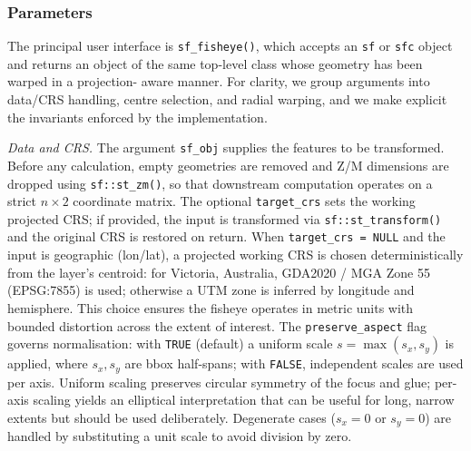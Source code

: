 \subsubsection{Parameters}\label{parameters}

The principal user interface is \texttt{sf\_fisheye()}, which accepts an \texttt{sf} or \texttt{sfc} object
and returns an object of the same top-level class whose geometry has been warped in a projection-
aware manner. For clarity, we group arguments into data/CRS handling, centre selection, and radial
warping, and we make explicit the invariants enforced by the implementation.

\emph{Data and CRS.} The argument \texttt{sf\_obj} supplies the features to be transformed. Before any
calculation, empty geometries are removed and Z/M dimensions are dropped using \texttt{sf::st\_zm()}, so
that downstream computation operates on a strict \(n\times 2\) coordinate matrix. The optional
\texttt{target\_crs} sets the working projected CRS; if provided, the input is transformed via
\texttt{sf::st\_transform()} and the original CRS is restored on return. When \texttt{target\_crs\ =\ NULL}
and the input is geographic (lon/lat), a projected working CRS is chosen deterministically from the
layer's centroid: for Victoria, Australia, GDA2020 / MGA Zone 55 (EPSG:7855) is used; otherwise a
UTM zone is inferred by longitude and hemisphere. This choice ensures the fisheye operates in metric
units with bounded distortion across the extent of interest. The \texttt{preserve\_aspect} flag governs
normalisation: with \texttt{TRUE} (default) a uniform scale \(s = \max(s_x, s_y)\) is applied, where
\(s_x, s_y\) are bbox half-spans; with \texttt{FALSE}, independent scales are used per axis. Uniform
scaling preserves circular symmetry of the focus and glue; per-axis scaling yields an elliptical
interpretation that can be useful for long, narrow extents but should be used deliberately. Degenerate
cases (\(s_x = 0\) or \(s_y = 0\)) are handled by substituting a unit scale to avoid division by zero.

